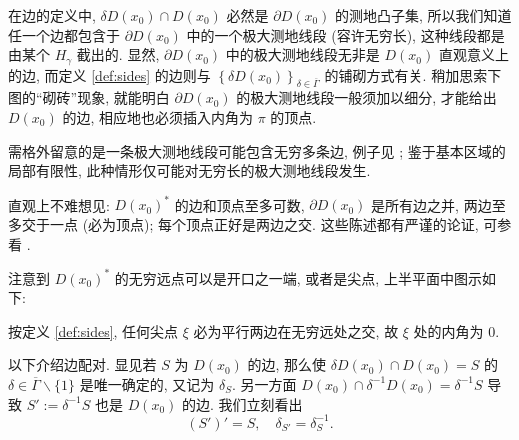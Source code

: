 在边的定义中, $\delta D(x_0) \cap D(x_0)$ 必然是 $\partial D(x_0)$ 的测地凸子集, 所以我们知道任一个边都包含于 $\partial D(x_0)$ 中的一个极大测地线段 (容许无穷长), 这种线段都是由某个 $H_\gamma$ 截出的. 显然, $\partial D(x_0)$ 中的极大测地线段无非是 $D(x_0)$ 直观意义上的边, 而定义 \ref{def:sides} 的边则与 $\left\{\delta D(x_0)\right\}_{\delta \in \overline{\Gamma}}$ 的铺砌方式有关. 稍加思索下图的``砌砖''现象, 就能明白 $\partial D(x_0)$ 的极大测地线段一般须加以细分, 才能给出 $D(x_0)$ 的边, 相应地也必须插入内角为 $\pi$ 的顶点.
\begin{center}\end{center}
需格外留意的是一条极大测地线段可能包含无穷多条边, 例子见 \cite[Example 10.1.1]{Bea95}; 鉴于基本区域的局部有限性, 此种情形仅可能对无穷长的极大测地线段发生.

直观上不难想见: $D(x_0)^*$ 的边和顶点至多可数, $\partial D(x_0)$ 是所有边之并, 两边至多交于一点 (必为顶点); 每个顶点正好是两边之交. 这些陈述都有严谨的论证, 可参看 \cite[\S 9.3]{Bea95}.

注意到 $D(x_0)^*$ 的无穷远点可以是开口之一端, 或者是尖点, 上半平面中图示如下:
\begin{center}\end{center}
按定义 \ref{def:sides}, 任何尖点 $\xi$ 必为平行两边在无穷远处之交, 故 $\xi$ 处的内角为 $0$.

以下介绍边配对. 显见若 $S$ 为 $D(x_0)$ 的边, 那么使 $\delta D(x_0) \cap D(x_0) = S$ 的 $\delta \in \overline{\Gamma} \smallsetminus \{1\}$ 是唯一确定的, 又记为 $\delta_S$. 另一方面 $D(x_0) \cap \delta^{-1} D(x_0) = \delta^{-1} S$ 导致 $S' := \delta^{-1} S$ 也是 $D(x_0)$ 的边. 我们立刻看出
\[ (S')' = S, \quad \delta_{S'} = \delta_S^{-1}. \]

